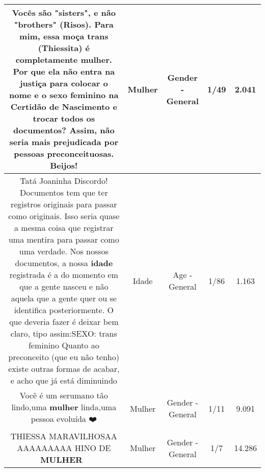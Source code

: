 \documentclass[11pt]{article}
\newlength\mylength
\begin{document}
\begin{center}
\begin{longtable}{|C{.65\mylength}|C{.30\mylength}|C{.12\mylength}|C{.12\mylength}|C{.12\mylength}|}
  \small Vocês são "sisters", e não "brothers" (Risos). Para mim, essa moça trans (Thiessita) é completamente \textbf{mulher}. Por que ela não entra na justiça para colocar o nome e o sexo feminino na Certidão de Nascimento e trocar todos os documentos? Assim, não seria mais prejudicada por pessoas preconceituosas. Beijos!\normalsize   & Mulher & Gender - General & 1/49 & 2.041 \\  \hline
  \small Tatá Joaninha   Discordo! Documentos tem que ter registros originais para passar como originais. Isso seria quase a mesma coisa que registrar uma mentira para passar como uma verdade. Nos nossos documentos, a nossa \textbf{idade} registrada é a do momento em que a gente nasceu e não aquela que a gente quer ou se identifica posteriormente. O que deveria fazer é deixar bem claro, tipo assim:SEXO:  trans feminino Quanto ao preconceito (que eu não tenho) existe outras formas de acabar, e acho que já está diminuindo\normalsize   & Idade & Age - General & 1/86 & 1.163 \\  \hline
  \small Você é um serumano tão lindo,uma \textbf{mulher} linda,uma pessoa evoluída ❤️\normalsize   & Mulher & Gender - General & 1/11 & 9.091 \\  \hline
  \small THIESSA MARAVILHOSAA AAAAAAAAA HINO DE \textbf{MULHER} 💖\normalsize   & Mulher & Gender - General & 1/7 & 14.286 \\  \hline
  
\end{longtable}
\end{center}
\end{document}
